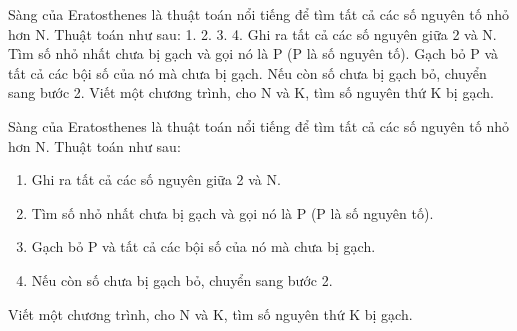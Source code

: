 Sàng của Eratosthenes là thuật toán nổi tiếng để tìm tất cả các số nguyên tố nhỏ hơn N. Thuật toán như sau: 1. 2. 3. 4. Ghi ra tất cả các số nguyên giữa 2 và N. Tìm số nhỏ nhất chưa bị gạch và gọi nó là P (P là số nguyên tố). Gạch bỏ P và tất cả các bội số của nó mà chưa bị gạch. Nếu còn số chưa bị gạch bỏ, chuyển sang bước 2. Viết một chương trình, cho N và K, tìm số nguyên thứ K bị gạch.

Sàng của Eratosthenes là thuật toán nổi tiếng để tìm tất cả các số nguyên tố nhỏ hơn N. Thuật toán như sau:
\begin{enumerate}
	\item Ghi ra tất cả các số nguyên giữa 2 và N.
	\item Tìm số nhỏ nhất chưa bị gạch và gọi nó là P (P là số nguyên tố).
	\item Gạch bỏ P và tất cả các bội số của nó mà chưa bị gạch.
	\item Nếu còn số chưa bị gạch bỏ, chuyển sang bước 2.
\end{enumerate}

Viết một chương trình, cho N và K, tìm số nguyên thứ K bị gạch.